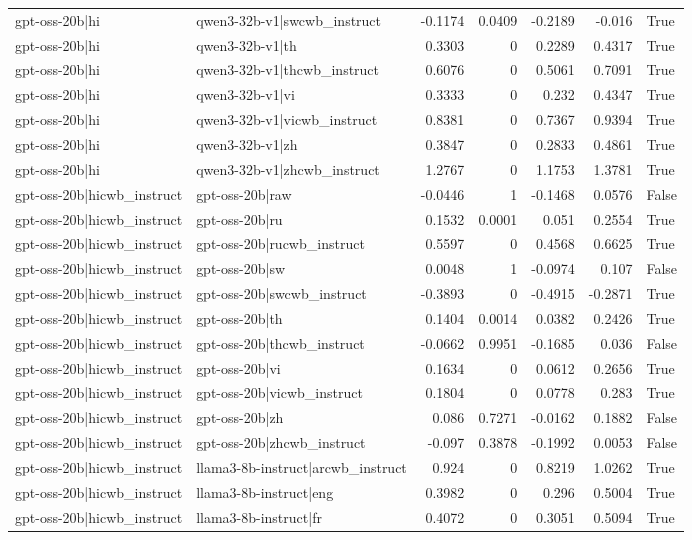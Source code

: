 \begin{table}
\begin{tabular}{l l r r r r l}
gpt-oss-20b|hi & qwen3-32b-v1|swcwb_instruct & -0.1174 & 0.0409 & -0.2189 & -0.016 & True \\
gpt-oss-20b|hi & qwen3-32b-v1|th & 0.3303 & 0 & 0.2289 & 0.4317 & True \\
gpt-oss-20b|hi & qwen3-32b-v1|thcwb_instruct & 0.6076 & 0 & 0.5061 & 0.7091 & True \\
gpt-oss-20b|hi & qwen3-32b-v1|vi & 0.3333 & 0 & 0.232 & 0.4347 & True \\
gpt-oss-20b|hi & qwen3-32b-v1|vicwb_instruct & 0.8381 & 0 & 0.7367 & 0.9394 & True \\
gpt-oss-20b|hi & qwen3-32b-v1|zh & 0.3847 & 0 & 0.2833 & 0.4861 & True \\
gpt-oss-20b|hi & qwen3-32b-v1|zhcwb_instruct & 1.2767 & 0 & 1.1753 & 1.3781 & True \\
gpt-oss-20b|hicwb_instruct & gpt-oss-20b|raw & -0.0446 & 1 & -0.1468 & 0.0576 & False \\
gpt-oss-20b|hicwb_instruct & gpt-oss-20b|ru & 0.1532 & 0.0001 & 0.051 & 0.2554 & True \\
gpt-oss-20b|hicwb_instruct & gpt-oss-20b|rucwb_instruct & 0.5597 & 0 & 0.4568 & 0.6625 & True \\
gpt-oss-20b|hicwb_instruct & gpt-oss-20b|sw & 0.0048 & 1 & -0.0974 & 0.107 & False \\
gpt-oss-20b|hicwb_instruct & gpt-oss-20b|swcwb_instruct & -0.3893 & 0 & -0.4915 & -0.2871 & True \\
gpt-oss-20b|hicwb_instruct & gpt-oss-20b|th & 0.1404 & 0.0014 & 0.0382 & 0.2426 & True \\
gpt-oss-20b|hicwb_instruct & gpt-oss-20b|thcwb_instruct & -0.0662 & 0.9951 & -0.1685 & 0.036 & False \\
gpt-oss-20b|hicwb_instruct & gpt-oss-20b|vi & 0.1634 & 0 & 0.0612 & 0.2656 & True \\
gpt-oss-20b|hicwb_instruct & gpt-oss-20b|vicwb_instruct & 0.1804 & 0 & 0.0778 & 0.283 & True \\
gpt-oss-20b|hicwb_instruct & gpt-oss-20b|zh & 0.086 & 0.7271 & -0.0162 & 0.1882 & False \\
gpt-oss-20b|hicwb_instruct & gpt-oss-20b|zhcwb_instruct & -0.097 & 0.3878 & -0.1992 & 0.0053 & False \\
gpt-oss-20b|hicwb_instruct & llama3-8b-instruct|arcwb_instruct & 0.924 & 0 & 0.8219 & 1.0262 & True \\
gpt-oss-20b|hicwb_instruct & llama3-8b-instruct|eng & 0.3982 & 0 & 0.296 & 0.5004 & True \\
gpt-oss-20b|hicwb_instruct & llama3-8b-instruct|fr & 0.4072 & 0 & 0.3051 & 0.5094 & True \\

\end{tabular}
\end{table}
